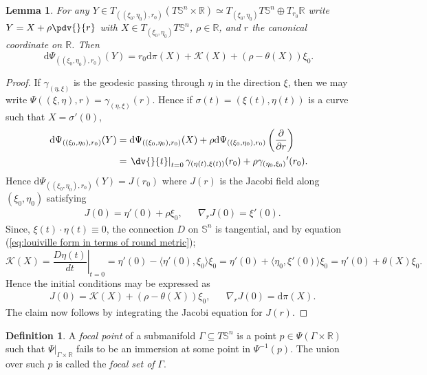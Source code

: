 \documentclass[12pt]{amsart}
\theoremstyle{plain}
\newtheorem{Lem}{Lemma}
\theoremstyle{definition}
\newtheorem{Def}{Definition}
\def\S{\mathbb{S}}
\newcommand{\td}{\mathrm{d}}
\numberwithin{equation}{section}
\begin{document}
\begin{Lem}\label{Lem: decomposition of psi}
     For any $Y\in T_{((\xi_0,\eta_0),r_0)}(T\S^n\times \mathbb{R})\simeq  T_{(\xi_0,\eta_0)}T\S^n \oplus T_{r_0}\mathbb{R}$ write $Y=X+\rho\displaystyle{\pdv{}{r}}$ with $X\in T_{(\xi_0,\eta_0)}T\S^n$, $\rho\in\mathbb{R}$, and $r$ the canonical coordinate on $\mathbb{R}$. Then
     \begin{equation}\label{eq: decomposition of dPsi}
     \td\Psi_{((\xi_0,\eta_0),r_0)}(Y)=r_0\td\pi(X)+\mathcal{K}(X)+(\rho-\theta(X))\xi_0.
     \end{equation}
 \end{Lem}
 \begin{proof}
      If $\gamma_{(\eta,\xi)}$ is the geodesic passing through $\eta$ in the direction $\xi$, then we may write $\Psi((\xi,\eta),r)=\gamma_{(\eta,\xi)}(r)$. Hence if $\sigma(t)=(\xi(t),\eta(t))$ is a curve such that $X=\sigma'(0)$,
    \begin{align*}
        \td\Psi_{((\xi_0,\eta_0),r_0)}(Y)&=\td\Psi_{((\xi_0,\eta_0),r_0)}(X)+\rho\td\Psi_{((\xi_0,\eta_0),r_0)}\left(\displaystyle\frac{\partial}{\partial r}\right)\\
        &= \left.\dv{}{t}\right|_{t=0}\gamma_{(\eta(t),\xi(t))}(r_0)+\rho \gamma_{(\eta_0,\xi_0)}{}'(r_0).
    \end{align*}
    Hence $\td\Psi_{((\xi_0,\eta_0),r_0)}(Y)=J(r_0)$ where $J(r)$ is the Jacobi field along $(\xi_0,\eta_0)$ satisfying
    \begin{align*}
        &J(0)=\eta'(0)+\rho \xi_0, &&\nabla_rJ (0)=\xi'(0).
    \end{align*}
     Since, $\xi(t)\cdot\eta(t)\equiv0$, the connection $D$ on $\S^n$ is tangential, and by equation (\ref{eq:louiville form in terms of round metric});
     \[
     \mathcal{K}(X)=\left.\frac{D\eta(t)}{dt}\right|_{t=0}=\eta'(0)-\langle\eta'(0),\xi_0\rangle\xi_0=\eta'(0)+\langle\eta_0,\xi'(0)\rangle\xi_0=\eta'(0)+\theta(X)\xi_0.
     \]
     Hence the initial conditions may be expressed as
     \begin{align*}
        &J(0)=\mathcal{K}(X)+(\rho-\theta(X))\xi_0, &&\nabla_rJ (0)=\td\pi(X).
    \end{align*}
     The claim now follows by integrating the Jacobi equation for $J(r)$.
 \end{proof}
 \begin{Def}\label{def: focal points}
    A \emph{focal point} of a submanifold $\Gamma\subseteq T\mathbb{S}^n$ is a point $p\in\Psi(\Gamma\times \mathbb{R})$ such that $\Psi|_{\Gamma\times\mathbb{R}}$ fails to be an immersion at some point in $\Psi^{-1}(p)$. The union over such $p$ is called the \emph{focal set of} $\Gamma$.
\end{Def}
\end{document}
